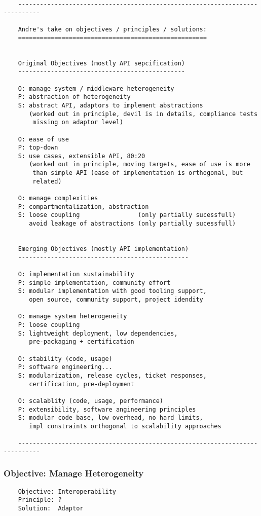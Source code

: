 \documentclass[a4paper,10pt]{article}
\begin{document}
  \begin{verbatim}
    ----------------------------------------------------------------------------

    Andre's take on objectives / principles / solutions:
    ====================================================


    Original Objectives (mostly API sepcification)
    ----------------------------------------------

    O: manage system / middleware heterogeneity
    P: abstraction of heterogeneity
    S: abstract API, adaptors to implement abstractions
       (worked out in principle, devil is in details, compliance tests
        missing on adaptor level)

    O: ease of use
    P: top-down
    S: use cases, extensible API, 80:20
       (worked out in principle, moving targets, ease of use is more
        than simple API (ease of implementation is orthogonal, but
        related)

    O: manage complexities
    P: compartmentalization, abstraction
    S: loose coupling                (only partially sucessfull)
       avoid leakage of abstractions (only partially sucessfull)


    Emerging Objectives (mostly API implementation)
    -----------------------------------------------

    O: implementation sustainability
    P: simple implementation, community effort
    S: modular implementation with good tooling support,
       open source, community support, project idendity

    O: manage system heterogeneity
    P: loose coupling
    S: lightweight deployment, low dependencies, 
       pre-packaging + certification

    O: stability (code, usage)
    P: software engineering...
    S: modularization, release cycles, ticket responses,
       certification, pre-deployment

    O: scalablity (code, usage, performance)
    P: extensibility, software angineering principles
    S: modular code base, low overhead, no hard limits,
       impl constraints orthogonal to scalability approaches

    ----------------------------------------------------------------------------
  \end{verbatim}


 \subsubsection{Objective: Manage Heterogeneity}
  \begin{verbatim}
    Objective: Interoperability
    Principle: ?
    Solution:  Adaptor
   \end{verbatim}
\end{document}
